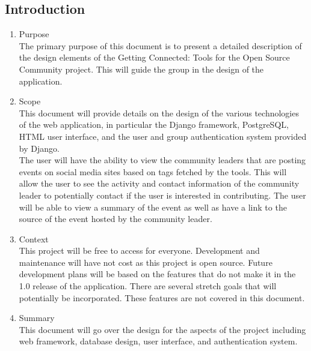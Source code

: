 \documentclass[draftclsnofoot,10pt,onecolumn]{IEEEtran} %
\begin{document}
\subsection{Introduction}
	\begin{enumerate}
	
		\item Purpose \\
		The primary purpose of this document is to present a detailed description of the design elements of the Getting
		Connected: Tools for the Open Source Community project. This will guide the group in the design of the
		application.\\
		
		\item Scope \\
		This document will provide details on the design of the various technologies of the web application, in particular the
		Django framework, PostgreSQL, HTML user interface, and the user and group authentication system provided by Django.\\

		The user will have the ability to view the community leaders that are posting events on social media sites based on
		tags fetched by the tools. This will allow the user to see the activity and contact information of the community leader
		to potentially contact if the user is interested in contributing. The user will be able to view a summary of the event as
		well as have a link to the source of the event hosted by the community leader.\\
		
		\item Context \\
		This project will be free to access for everyone. Development and maintenance will have not cost as this project is
		open source. Future development plans will be based on the features that do not make it in the 1.0 release of the
		application. There are several stretch goals that will potentially be incorporated. These features are not covered in
		this document.\\
		
		\item Summary \\
		This document will go over the design for the aspects of the project including web framework, database design, user
		interface, and authentication system. \\
	\end{enumerate}
\end{document}
